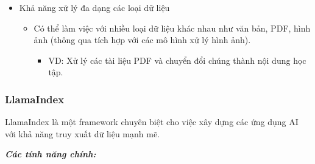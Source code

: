 \begin{itemize}
\begin{itemize}
\begin{itemize}
        \end{itemize}
    \end{itemize}
    \item Khả năng xử lý đa dạng các loại dữ liệu
        \begin{itemize}
        \item Có thể làm việc với nhiều loại dữ liệu khác nhau như văn bản, PDF, hình ảnh (thông qua tích hợp với các mô hình xử lý hình ảnh).
        \begin{itemize}
            \item VD: Xử lý các tài liệu PDF và chuyển đổi chúng thành nội dung học tập.
        \end{itemize}
    \end{itemize}
\end{itemize}
\subsubsection{LlamaIndex}
LlamaIndex là một framework chuyên biệt cho việc xây dựng các ứng dụng AI với khả năng truy xuất dữ liệu mạnh mẽ.
\par
\textbf{\textit{Các tính năng chính:}}
